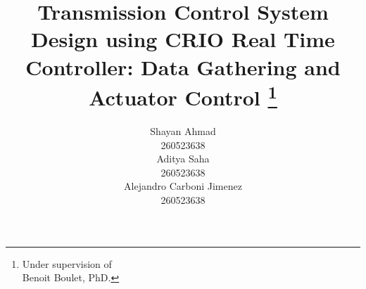 \documentclass[12pt,titlepage]{article}
\begin{document}
\title{Transmission Control System Design using CRIO Real Time Controller:
Data Gathering and Actuator Control
\thanks{Under supervision of \\ Benoit Boulet, PhD.}
}
\author{
Shayan Ahmad \\
260523638 \\
Aditya Saha \\
260523638 \\
Alejandro Carboni Jimenez \\
260523638 \\
}

\maketitle
\end{document}
